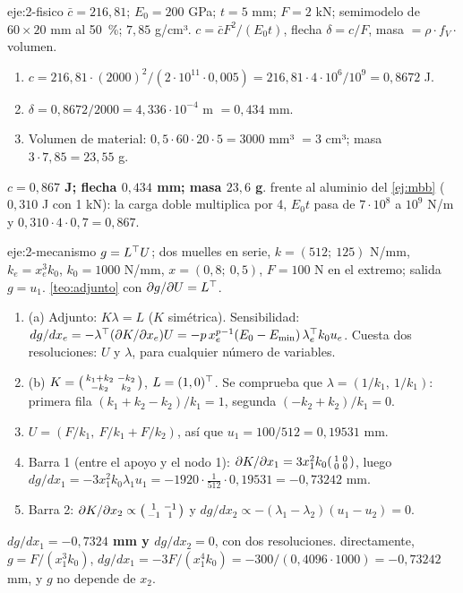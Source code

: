 \begin{solucion}{eje:2-fisico}
\datos $\bar c=216{,}81$; $E_0=200$ GPa; $t=5$ mm; $F=2$ kN; semimodelo de $60\times 20$ mm al 50~\%; $7{,}85$ g/cm³.
\planteamiento $c=\bar cF^2/(E_0t)$, flecha $\delta=c/F$, masa $=\rho\cdot f_V\cdot$volumen.
\pasos
\begin{enumerate}[label=\arabic*.]
  \item $c=216{,}81\cdot(2000)^2/(2\cdot 10^{11}\cdot 0{,}005)=216{,}81\cdot 4\cdot 10^6/10^9=0{,}8672$ J.
  \item $\delta=0{,}8672/2000=4{,}336\cdot 10^{-4}$ m $=0{,}434$ mm.
  \item Volumen de material: $0{,}5\cdot 60\cdot 20\cdot 5=3000$ mm³ $=3$ cm³; masa $3\cdot 7{,}85=23{,}55$ g.
\end{enumerate}
\resultado \textbf{$c=0{,}867$ J; flecha $0{,}434$ mm; masa $23{,}6$ g}.
\comprobacion frente al aluminio del \cref{ej:mbb} ($0{,}310$ J con 1 kN): la carga doble multiplica por 4, $E_0t$ pasa de $7\cdot 10^8$ a $10^9$ N/m y $0{,}310\cdot 4\cdot 0{,}7=0{,}867$.
\end{solucion}

\begin{solucion}{eje:2-mecanismo}
\datos $g=L^\top U$; dos muelles en serie, $k=(512;\ 125)$ N/mm, $k_e=x_e^3k_0$, $k_0=1000$ N/mm, $x=(0{,}8;\ 0{,}5)$, $F=100$ N en el extremo; salida $g=u_1$.
\planteamiento \cref{teo:adjunto} con $\partial g/\partial U=L^\top$.
\pasos
\begin{enumerate}[label=\arabic*.]
  \item (a) Adjunto: $K\lambda=L$ ($K$ simétrica). Sensibilidad: $dg/dx_e=-\lambda^\top(\partial K/\partial x_e)U=-p\,x_e^{p-1}(E_0-E_{\min})\,\lambda_e^\top k_0u_e$. Cuesta dos resoluciones: $U$ y $\lambda$, para cualquier número de variables.
  \item (b) $K=\begin{psmallmatrix}k_1+k_2&-k_2\\-k_2&k_2\end{psmallmatrix}$, $L=(1,0)^\top$. Se comprueba que $\lambda=(1/k_1,\ 1/k_1)$: primera fila $(k_1+k_2-k_2)/k_1=1$, segunda $(-k_2+k_2)/k_1=0$.
  \item $U=(F/k_1,\ F/k_1+F/k_2)$, así que $u_1=100/512=0{,}19531$ mm.
  \item Barra 1 (entre el apoyo y el nodo 1): $\partial K/\partial x_1=3x_1^2k_0\begin{psmallmatrix}1&0\\0&0\end{psmallmatrix}$, luego $dg/dx_1=-3x_1^2k_0\lambda_1u_1=-1920\cdot\tfrac{1}{512}\cdot 0{,}19531=-0{,}73242$ mm.
  \item Barra 2: $\partial K/\partial x_2\propto\begin{psmallmatrix}1&-1\\-1&1\end{psmallmatrix}$ y $dg/dx_2\propto-(\lambda_1-\lambda_2)(u_1-u_2)=0$.
\end{enumerate}
\resultado \textbf{$dg/dx_1=-0{,}7324$ mm y $dg/dx_2=0$}, con dos resoluciones.
\comprobacion directamente, $g=F/(x_1^3k_0)$, $dg/dx_1=-3F/(x_1^4k_0)=-300/(0{,}4096\cdot 1000)=-0{,}73242$ mm, y $g$ no depende de $x_2$.
\end{solucion}

